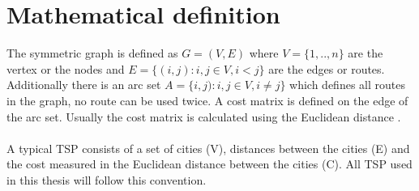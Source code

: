 \section{Mathematical definition}
The symmetric graph is defined as $G=(V,E)$ where $V=\{1,..,n\}$ are the vertex or the nodes and $E=\{(i,j):i,j\in V, i<j\}$ are the edges or routes. Additionally there is an arc set $A=\{i,j):i,j\in V, i\neq j\}$ which defines all routes in the graph, no route can be used twice. A cost matrix is defined on the edge of the arc set. Usually the cost matrix is calculated using the Euclidean distance \cite{Matai10}.\\\\
A typical TSP consists of a set of cities (V), distances between the cities (E) and the cost measured in the Euclidean distance between the cities (C). All TSP used in this thesis will follow this convention. 


 


